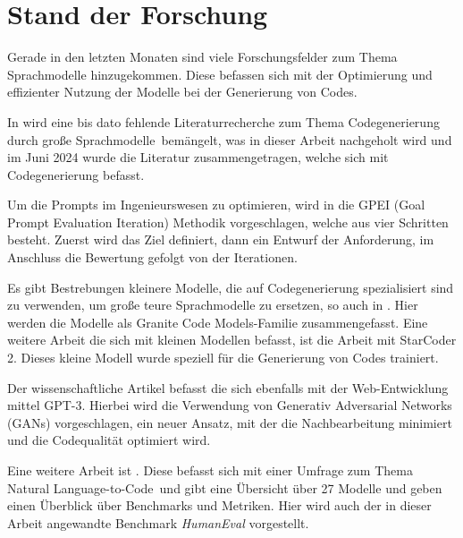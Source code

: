 

\section{Stand der Forschung}
Gerade in den letzten Monaten sind viele Forschungsfelder zum Thema Sprachmodelle hinzugekommen. Diese befassen sich mit der Optimierung und effizienter Nutzung der Modelle bei der Generierung von Codes.\vspace{0.2cm}

In \cite{jiang-2024} wird eine bis dato fehlende Literaturrecherche zum Thema \glqq Codegenerierung durch große Sprachmodelle\grqq \ bemängelt, was in dieser Arbeit nachgeholt wird und im Juni 2024 wurde die Literatur zusammengetragen, welche sich mit Codegenerierung befasst.\vspace{0.2cm}

Um die Prompts im Ingenieurswesen zu optimieren, wird in \cite{velasquez-henao-2023} die GPEI (Goal Prompt Evaluation Iteration) Methodik vorgeschlagen, welche aus vier Schritten besteht. Zuerst wird das Ziel definiert, dann ein Entwurf der Anforderung, im Anschluss die Bewertung gefolgt von der Iterationen.\vspace{0.2cm}

Es gibt Bestrebungen kleinere Modelle, die auf Codegenerierung spezialisiert sind zu verwenden, um große teure Sprachmodelle zu ersetzen, so auch in \cite{mishra-2024}. Hier werden die Modelle als \glqq Granite Code Models\grqq -Familie zusammengefasst. Eine weitere Arbeit die sich mit kleinen Modellen befasst, ist die Arbeit \cite{lozhkov-2024} mit StarCoder 2. Dieses kleine Modell wurde speziell für die Generierung von Codes trainiert.\vspace{0.2cm}

Der wissenschaftliche Artikel \cite{nataraj-2024} befasst die sich ebenfalls mit der Web-Entwicklung mittel GPT-3. Hierbei wird die Verwendung von Generativ Adversarial Networks (GANs) vorgeschlagen, ein neuer Ansatz, mit der die Nachbearbeitung minimiert und die Codequalität optimiert wird.\vspace{0.2cm}

Eine weitere Arbeit ist \cite{zan-2022}. Diese befasst sich mit einer Umfrage zum Thema \glqq Natural Language-to-Code\grqq \ und gibt eine Übersicht über 27 Modelle und geben einen Überblick über Benchmarks und Metriken. Hier wird auch der in dieser Arbeit angewandte Benchmark \textit{HumanEval} vorgestellt.


